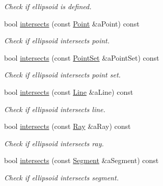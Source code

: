 \begin{DoxyCompactItemize}
\begin{DoxyCompactList}\small\item\em Check if ellipsoid is defined. \end{DoxyCompactList}\item 
bool \hyperlink{classlibrary_1_1math_1_1geom_1_1d3_1_1objects_1_1_ellipsoid_ab5fedfe26943a98263bfa441c259581b}{intersects} (const \hyperlink{classlibrary_1_1math_1_1geom_1_1d3_1_1objects_1_1_point}{Point} \&a\+Point) const
\begin{DoxyCompactList}\small\item\em Check if ellipsoid intersects point. \end{DoxyCompactList}\item 
bool \hyperlink{classlibrary_1_1math_1_1geom_1_1d3_1_1objects_1_1_ellipsoid_a2058e665b70c0e883a6ca195fa97120e}{intersects} (const \hyperlink{classlibrary_1_1math_1_1geom_1_1d3_1_1objects_1_1_point_set}{Point\+Set} \&a\+Point\+Set) const
\begin{DoxyCompactList}\small\item\em Check if ellipsoid intersects point set. \end{DoxyCompactList}\item 
bool \hyperlink{classlibrary_1_1math_1_1geom_1_1d3_1_1objects_1_1_ellipsoid_a50957c46fca340a2d20e1845f97f9131}{intersects} (const \hyperlink{classlibrary_1_1math_1_1geom_1_1d3_1_1objects_1_1_line}{Line} \&a\+Line) const
\begin{DoxyCompactList}\small\item\em Check if ellipsoid intersects line. \end{DoxyCompactList}\item 
bool \hyperlink{classlibrary_1_1math_1_1geom_1_1d3_1_1objects_1_1_ellipsoid_a8346f54be39644c22a5a8728ac368832}{intersects} (const \hyperlink{classlibrary_1_1math_1_1geom_1_1d3_1_1objects_1_1_ray}{Ray} \&a\+Ray) const
\begin{DoxyCompactList}\small\item\em Check if ellipsoid intersects ray. \end{DoxyCompactList}\item 
bool \hyperlink{classlibrary_1_1math_1_1geom_1_1d3_1_1objects_1_1_ellipsoid_a6d447b106d193af47c6b201f7e01bd26}{intersects} (const \hyperlink{classlibrary_1_1math_1_1geom_1_1d3_1_1objects_1_1_segment}{Segment} \&a\+Segment) const
\begin{DoxyCompactList}\small\item\em Check if ellipsoid intersects segment. \end{DoxyCompactList}\item 

\end{DoxyCompactItemize}
